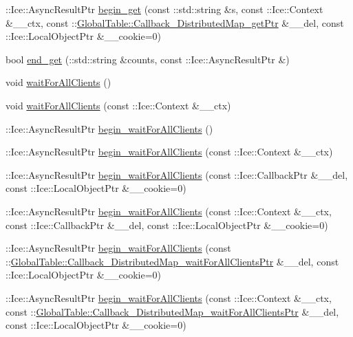 \begin{DoxyCompactItemize}
\item 
::Ice::AsyncResultPtr \hyperlink{class_ice_proxy_1_1_global_table_1_1_distributed_map_a99f52b06da4fe74328436932b04cc4a5}{begin\_\-get} (const ::std::string \&s, const ::Ice::Context \&\_\-\_\-ctx, const ::\hyperlink{namespace_global_table_a9ad421b8bc43ec4b2173407f2bed7ecc}{GlobalTable::Callback\_\-DistributedMap\_\-getPtr} \&\_\-\_\-del, const ::Ice::LocalObjectPtr \&\_\-\_\-cookie=0)
\item 
bool \hyperlink{class_ice_proxy_1_1_global_table_1_1_distributed_map_a13fa97edac4be45474d7079ff2516efe}{end\_\-get} (::std::string \&counts, const ::Ice::AsyncResultPtr \&)
\item 
void \hyperlink{class_ice_proxy_1_1_global_table_1_1_distributed_map_ae1847480af444f5f31c475df4b288b87}{waitForAllClients} ()
\item 
void \hyperlink{class_ice_proxy_1_1_global_table_1_1_distributed_map_ae0bc0cb4bffe02d4308fdb0730bb7f83}{waitForAllClients} (const ::Ice::Context \&\_\-\_\-ctx)
\item 
::Ice::AsyncResultPtr \hyperlink{class_ice_proxy_1_1_global_table_1_1_distributed_map_a874afc4d8f61d5e42bfdecfb69555e9b}{begin\_\-waitForAllClients} ()
\item 
::Ice::AsyncResultPtr \hyperlink{class_ice_proxy_1_1_global_table_1_1_distributed_map_a3c736216e45dc8006fde4b73131f2148}{begin\_\-waitForAllClients} (const ::Ice::Context \&\_\-\_\-ctx)
\item 
::Ice::AsyncResultPtr \hyperlink{class_ice_proxy_1_1_global_table_1_1_distributed_map_a8ca463f898a8445e466a54402518ffc6}{begin\_\-waitForAllClients} (const ::Ice::CallbackPtr \&\_\-\_\-del, const ::Ice::LocalObjectPtr \&\_\-\_\-cookie=0)
\item 
::Ice::AsyncResultPtr \hyperlink{class_ice_proxy_1_1_global_table_1_1_distributed_map_abf099130b62fb48def9a78f2a05b290f}{begin\_\-waitForAllClients} (const ::Ice::Context \&\_\-\_\-ctx, const ::Ice::CallbackPtr \&\_\-\_\-del, const ::Ice::LocalObjectPtr \&\_\-\_\-cookie=0)
\item 
::Ice::AsyncResultPtr \hyperlink{class_ice_proxy_1_1_global_table_1_1_distributed_map_a046d0ae195ef45e35d3fe8d2c8cb6baf}{begin\_\-waitForAllClients} (const ::\hyperlink{namespace_global_table_a110ac4602b8f6c72aa866923747317e3}{GlobalTable::Callback\_\-DistributedMap\_\-waitForAllClientsPtr} \&\_\-\_\-del, const ::Ice::LocalObjectPtr \&\_\-\_\-cookie=0)
\item 
::Ice::AsyncResultPtr \hyperlink{class_ice_proxy_1_1_global_table_1_1_distributed_map_a2e8a0463f9adebd2d3d967daf07515ab}{begin\_\-waitForAllClients} (const ::Ice::Context \&\_\-\_\-ctx, const ::\hyperlink{namespace_global_table_a110ac4602b8f6c72aa866923747317e3}{GlobalTable::Callback\_\-DistributedMap\_\-waitForAllClientsPtr} \&\_\-\_\-del, const ::Ice::LocalObjectPtr \&\_\-\_\-cookie=0)

\end{DoxyCompactItemize}
